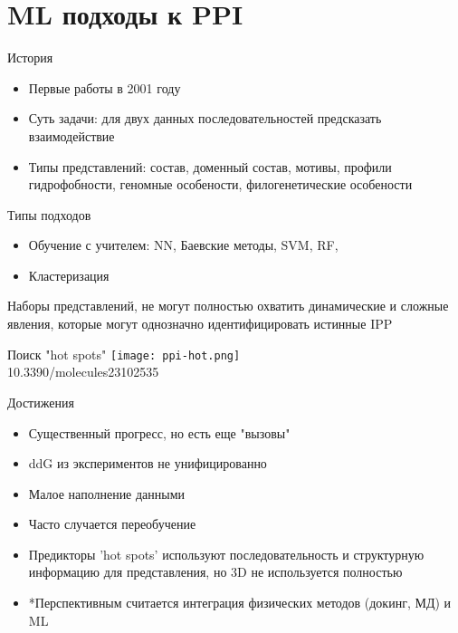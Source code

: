 \section{ML подходы к PPI}

\begin{frame}{История}
    \begin{itemize}
        \item Первые работы в 2001 году
        \item Суть задачи: для двух данных  последовательностей предсказать взаимодействие
        \item Типы представлений: состав, доменный состав, мотивы, профили гидрофобности, геномные особености, филогенетические особености
    \end{itemize}
\end{frame}

\begin{frame}{Типы подходов}
    \begin{itemize}
        \item Обучение с учителем: NN, Баевские методы, SVM, RF,
        \item Кластеризация
    \end{itemize}
 \footnotesize     *Наборы представлений, не могут полностью охватить динамические и сложные явления, которые могут
однозначно идентифицировать истинные IPP
\end{frame}
	
\begin{frame}{Поиск "hot spots"}
    \centering
    \texttt{[image: ppi-hot.png]}\\
    \footnotesize  10.3390/molecules23102535 
\end{frame}

\begin{frame}{Достижения}
    \begin{itemize}
        \item Существенный прогресс, но есть еще "вызовы"
        \item ddG из экспериментов не унифицированно
        \item Малое наполнение данными
        \item Часто случается переобучение
        \item Предикторы 'hot spots'   используют последовательность и структурную информацию для представления, но 3D не используется полностью
        \item *Перспективным считается интеграция физических методов (докинг, МД) и ML
    \end{itemize}
\end{frame}

